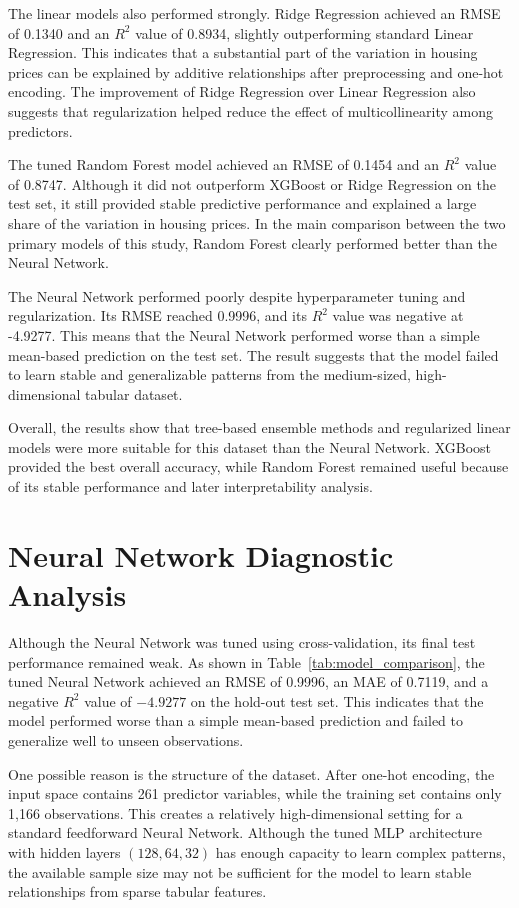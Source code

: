 \documentclass[12pt,a4paper,oneside,openany]{book}
\begin{document}
The linear models also performed strongly. Ridge Regression achieved an RMSE of 0.1340 and an $R^2$ value of 0.8934, slightly outperforming standard Linear Regression. This indicates that a substantial part of the variation in housing prices can be explained by additive relationships after preprocessing and one-hot encoding. The improvement of Ridge Regression over Linear Regression also suggests that regularization helped reduce the effect of multicollinearity among predictors.

The tuned Random Forest model achieved an RMSE of 0.1454 and an $R^2$ value of 0.8747. Although it did not outperform XGBoost or Ridge Regression on the test set, it still provided stable predictive performance and explained a large share of the variation in housing prices. In the main comparison between the two primary models of this study, Random Forest clearly performed better than the Neural Network.

The Neural Network performed poorly despite hyperparameter tuning and regularization. Its RMSE reached 0.9996, and its $R^2$ value was negative at -4.9277. This means that the Neural Network performed worse than a simple mean-based prediction on the test set. The result suggests that the model failed to learn stable and generalizable patterns from the medium-sized, high-dimensional tabular dataset.

Overall, the results show that tree-based ensemble methods and regularized linear models were more suitable for this dataset than the Neural Network. XGBoost provided the best overall accuracy, while Random Forest remained useful because of its stable performance and later interpretability analysis.


\section{Neural Network Diagnostic Analysis}

Although the Neural Network was tuned using cross-validation, its final test performance remained weak. As shown in Table~\ref{tab:model_comparison}, the tuned Neural Network achieved an RMSE of 0.9996, an MAE of 0.7119, and a negative $R^2$ value of $-4.9277$ on the hold-out test set. This indicates that the model performed worse than a simple mean-based prediction and failed to generalize well to unseen observations.

One possible reason is the structure of the dataset. After one-hot encoding, the input space contains 261 predictor variables, while the training set contains only 1,166 observations. This creates a relatively high-dimensional setting for a standard feedforward Neural Network. Although the tuned MLP architecture with hidden layers $(128,64,32)$ has enough capacity to learn complex patterns, the available sample size may not be sufficient for the model to learn stable relationships from sparse tabular features.
\end{document}
